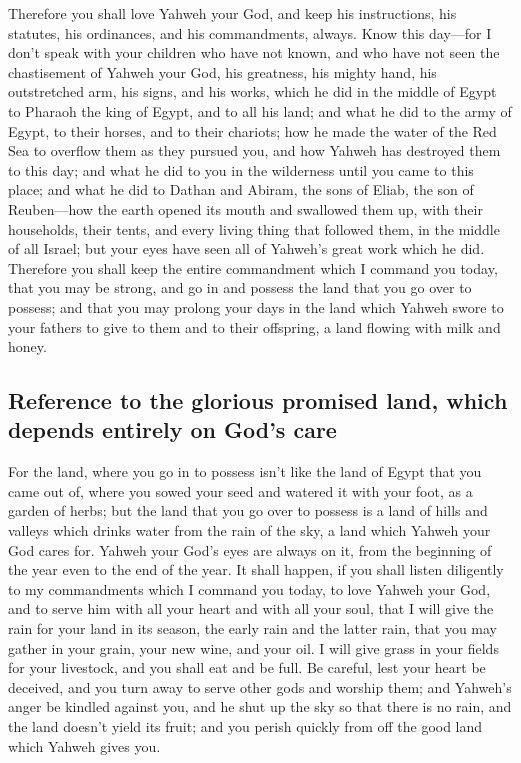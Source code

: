  Therefore you shall love Yahweh your God, and keep his
instructions, his statutes, his ordinances, and his commandments,
always.  Know this day---for I don't speak with your
children who have not known, and who have not seen the chastisement of
Yahweh your God, his greatness, his mighty hand, his outstretched arm,
 his signs, and his works, which he did in the middle of
Egypt to Pharaoh the king of Egypt, and to all his land; 
and what he did to the army of Egypt, to their horses, and to their
chariots; how he made the water of the Red Sea to overflow them as they
pursued you, and how Yahweh has destroyed them to this day;
 and what he did to you in the wilderness until you came
to this place;  and what he did to Dathan and Abiram, the
sons of Eliab, the son of Reuben---how the earth opened its mouth and
swallowed them up, with their households, their tents, and every living
thing that followed them, in the middle of all Israel; 
but your eyes have seen all of Yahweh's great work which he did.
 Therefore you shall keep the entire commandment which I
command you today, that you may be strong, and go in and possess the
land that you go over to possess;  and that you may
prolong your days in the land which Yahweh swore to your fathers to give
to them and to their offspring, a land flowing with milk and honey.

\hypertarget{reference-to-the-glorious-promised-land-which-depends-entirely-on-gods-care}{%
\subsection{Reference to the glorious promised land, which depends
entirely on God's
care}\label{reference-to-the-glorious-promised-land-which-depends-entirely-on-gods-care}}

 For the land, where you go in to possess isn't like the
land of Egypt that you came out of, where you sowed your seed and
watered it with your foot, as a garden of herbs;  but the
land that you go over to possess is a land of hills and valleys which
drinks water from the rain of the sky,  a land which
Yahweh your God cares for. Yahweh your God's eyes are always on it, from
the beginning of the year even to the end of the year. 
It shall happen, if you shall listen diligently to my commandments which
I command you today, to love Yahweh your God, and to serve him with all
your heart and with all your soul,  that I will give the
rain for your land in its season, the early rain and the latter rain,
that you may gather in your grain, your new wine, and your oil.
 I will give grass in your fields for your livestock, and
you shall eat and be full.  Be careful, lest your heart
be deceived, and you turn away to serve other gods and worship them;
 and Yahweh's anger be kindled against you, and he shut
up the sky so that there is no rain, and the land doesn't yield its
fruit; and you perish quickly from off the good land which Yahweh gives
you.

